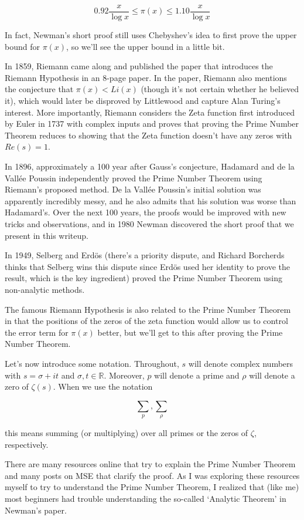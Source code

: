 \documentclass{article}
\theoremstyle{definition}
\begin{document}
\[ 0.92 \frac{x}{\log x} \leq \pi(x) \leq 1.10 \frac{x}{\log x} \]

In fact, Newman's short proof still uses Chebyshev's idea
to first prove the upper bound for $ \pi(x) $, so we'll see the upper bound in a little bit.

In 1859, Riemann came along and published the paper that introduces the
Riemann Hypothesis in an 8-page paper. In the paper, Riemann also
mentions the conjecture that $ \pi(x) < Li(x) $ (though it's not certain whether he believed it), which would later
be disproved by Littlewood and capture Alan Turing's interest. More importantly,
Riemann considers the Zeta function first introduced by Euler in 1737 
with complex inputs and proves that proving the Prime Number Theorem
reduces to showing that the Zeta function doesn't have any zeros with $ Re(s) = 1 $.

In 1896, approximately a 100 year after Gauss's conjecture, Hadamard and de la Vallée Poussin
independently proved the Prime Number Theorem using Riemann's proposed method. De la Vallée Poussin's
initial solution was apparently incredibly messy, and he also admits that his solution was worse than
Hadamard's. Over the next 100 years, the proofs would be improved with new tricks and observations, 
and in 1980 Newman discovered the short proof that we present in this writeup.

In 1949, Selberg and Erdös (there's a priority dispute, and Richard Borcherds thinks
that Selberg wins this dispute since Erdös used her identity to prove the result, which is the
key ingredient) proved the Prime Number Theorem using non-analytic methods.

The famous Riemann Hypothesis is also related to the Prime Number Theorem in that the positions of the
zeros of the zeta function would allow us to control the error term for $ \pi(x) $ better, but we'll
get to this after proving the Prime Number Theorem.

Let's now introduce some notation. Throughout, $ s $ will denote complex numbers with $ s = \sigma + it $ and $ \sigma, t \in \mathbb{R} $.
Moreover, $ p $ will denote a prime and $ \rho $ will denote a zero of $ \zeta(s) $.
When we use the notation 

\[ \sum_{p}, \sum_{\rho}\]

this means summing (or multiplying) over all primes or the zeros of $ \zeta $, respectively.

There are many resources online that try to explain the Prime Number Theorem and many posts
on MSE that clarify the proof. As I was exploring these resources myself to try to
understand the Prime Number Theorem, I realized that (like me) most beginners
had trouble understanding the so-called `Analytic Theorem' in Newman's paper. 
\end{document}
